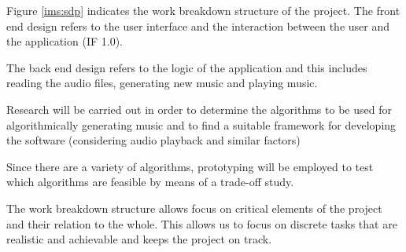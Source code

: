 Figure \ref{ims:sdp} indicates the work breakdown structure of the project. 
The front end design refers to the user interface and the interaction between the user and the application (IF 1.0).

The back end design refers to the logic of the application and this includes reading the audio files, generating new music and playing music.

Research will be carried out in order to determine the algorithms to be used for algorithmically generating music and to find a suitable framework for developing the software (considering audio playback and similar factors)

Since there are a variety of algorithms, prototyping will be employed to test which algorithms are feasible by means of a trade-off study.

The work breakdown structure allows focus on critical elements of the project and their relation to the whole. This allows us to focus on discrete tasks that are realistic and achievable and keeps the project on track.


